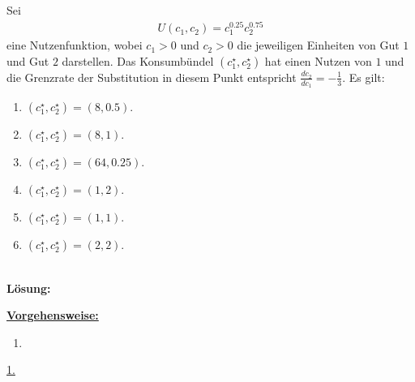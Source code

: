 \newpage

\subsection*{}
Sei 
\begin{align*}
	U(c_1,c_2) = c_1^{0.25} c_2^{0.75}
\end{align*}
eine Nutzenfunktion, wobei $c_1 > 0$ und $c_2 > 0$ die jeweiligen Einheiten von Gut $1$ und Gut $2$ darstellen.
Das Konsumbündel $(c_1^\star, c_2^\star)$ hat einen Nutzen von $1$ und die Grenzrate der Substitution in diesem Punkt entspricht
$\frac{d c_2}{d c_1} = - \frac{1}{3}$.
Es gilt:
\renewcommand{\labelenumi}{(\alph{enumi})}
\begin{enumerate}
	\item 
	$ (c_1^\star,c_2^\star) = (8,0.5) $.
	\item
	$ (c_1^\star,c_2^\star) = (8,1) $.
	\item
	$ (c_1^\star,c_2^\star) = (64,0.25) $.
	\item
	$ (c_1^\star,c_2^\star) = (1,2) $.
	\item
	$ (c_1^\star,c_2^\star) = (1,1) $.
	\item
	$ (c_1^\star,c_2^\star) = (2,2) $.
\end{enumerate}
\ \\
\textbf{Lösung:}
\begin{mdframed}
\underline{\textbf{Vorgehensweise:}}
\renewcommand{\labelenumi}{\theenumi.}
\begin{enumerate}
\item 
\end{enumerate}
\end{mdframed}

\underline{1. }\\





\newpage

